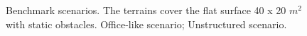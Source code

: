 \documentclass[letterpaper, 10 pt, conference]{ieeeconf}  %
\begin{document}
\begin{figure}[t]
    \setcounter{subfigure}{0}
     \begin{center}
        \hfill
    \end{center}
    \caption{%
       Benchmark scenarios. The terrains cover the flat surface 40 x 20 $m^{2}$ with static obstacles.  Office-like scenario;  Unstructured scenario.
     }%
   \label{fig:scenarios}
\end{figure}
\end{document}
